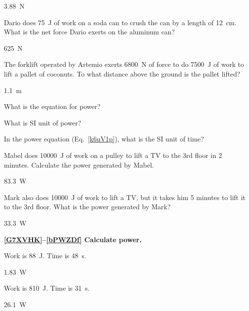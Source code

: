 \documentclass[../main-physics-problems.tex]{subfiles}
\begin{document}
\begin{questions}
\begin{solution}
\SI{3.88}{N}
\end{solution}

\question \label{7BKGsL}
Dario does \SI{75}{J} of work on a soda can to crush the can by a length of \SI{12}{cm}. What is the net force Dario exerts on the aluminum can?

\begin{solution}
\SI{625}{N}
\end{solution}


\question \label{sRogOc}
The forklift operated by Artemio exerts \SI{6800}{N} of force to do \SI{7500}{J} of work to lift a pallet of coconuts. To what distance above the ground is the pallet lifted? 

\begin{solution}
\SI{1.1}{m}
\end{solution}



\question \label{AlYFHO}
What is the equation for power?


\question
What is SI unit of power?


\question
In the power equation (Eq.~\ref{k6uV1p}), what is the SI unit of time?


\question \label{i4fTLq}
Mabel does \SI{10000}{J} of work on a pulley to lift a TV to the 3rd floor in 2 minutes. Calculate the power generated by Mabel.

\begin{solution}
\SI{83.3}{W}
\end{solution}

\question \label{vJllNv}
Mark also does \SI{10000}{J} of work to lift a TV, but it takes him 5 minutes to lift it to the 3rd floor. What is the power generated by Mark?

\begin{solution}
\SI{33.3}{W}
\end{solution}

\textbf{\ref{G7XVHK}--\ref{bPWZDf} Calculate power.}

\question \label{G7XVHK}
Work is \SI{88}{J}. Time is \SI{48}{s}.

\begin{solution}
\SI{1.83}{W}
\end{solution}

\question \label{CJRoQV}
Work is \SI{810}{J}. Time is \SI{31}{s}.

\begin{solution}
\SI{26.1}{W}
\end{solution}



\end{questions}
\end{document}
